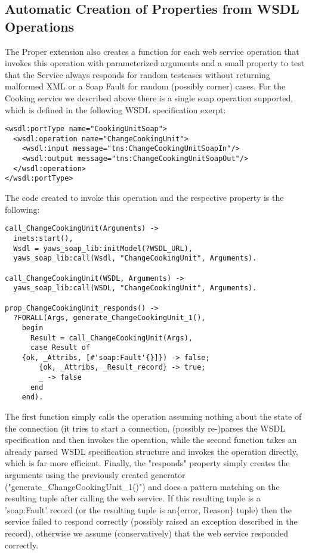 \documentclass[submission,copyright,a4]{eptcs}
\begin{document}
\subsection{Automatic Creation of Properties from WSDL Operations}

The Proper extension also creates a function for each web service operation that invokes this operation with parameterized arguments and a small property to test that the Service always responds for random testcases without returning malformed XML or a Soap Fault for random (possibly corner) cases. For the Cooking service we described above there is a single soap operation supported, which is defined in the following WSDL specification exerpt:

\begin{lstlisting}
<wsdl:portType name="CookingUnitSoap">
  <wsdl:operation name="ChangeCookingUnit">
    <wsdl:input message="tns:ChangeCookingUnitSoapIn"/>
    <wsdl:output message="tns:ChangeCookingUnitSoapOut"/>
  </wsdl:operation>
</wsdl:portType>
\end{lstlisting}

The code created to invoke this operation and the respective property is the following:

\begin{lstlisting}
call_ChangeCookingUnit(Arguments) ->
  inets:start(),
  Wsdl = yaws_soap_lib:initModel(?WSDL_URL),
  yaws_soap_lib:call(Wsdl, "ChangeCookingUnit", Arguments).

call_ChangeCookingUnit(WSDL, Arguments) ->
  yaws_soap_lib:call(WSDL, "ChangeCookingUnit", Arguments).

prop_ChangeCookingUnit_responds() ->
  ?FORALL(Args, generate_ChangeCookingUnit_1(),
    begin
      Result = call_ChangeCookingUnit(Args),
      case Result of
	{ok, _Attribs, [#'soap:Fault'{}]}) -> false;
        {ok, _Attribs, _Result_record} -> true;
        _ -> false
      end
    end).
\end{lstlisting}

The first function simply calls the operation assuming nothing about the state of the connection (it tries to start a connection, (possibly re-)parses the WSDL specification and then invokes the operation, while the second function takes an already parsed WSDL specification structure and invokes the operation directly, which is far more efficient. Finally, the "responds" property simply creates the arguments using the previously created generator ("generate\_ChangeCookingUnit\_1()") and does a pattern matching on the resulting tuple after calling the web service. If this resulting tuple is a 'soap:Fault' record (or the resulting tuple is an\{error, Reason\} tuple) then the service failed to respond correctly (possibly raised an exception described in the record), otherwise we assume (conservatively) that the web service responded correctly.
\end{document}
